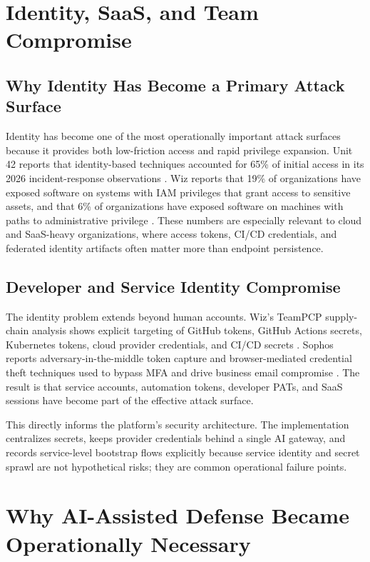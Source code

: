 \section{Identity, SaaS, and Team Compromise}
\subsection{Why Identity Has Become a Primary Attack Surface}
Identity has become one of the most operationally important attack surfaces because it provides both low-friction access and rapid privilege expansion. Unit 42 reports that identity-based techniques accounted for 65\% of initial access in its 2026 incident-response observations \cite{unit42_ir_2026}. Wiz reports that 19\% of organizations have exposed software on systems with IAM privileges that grant access to sensitive assets, and that 6\% of organizations have exposed software on machines with paths to administrative privilege \cite{wiz_ai_readiness_2026}. These numbers are especially relevant to cloud and SaaS-heavy organizations, where access tokens, CI/CD credentials, and federated identity artifacts often matter more than endpoint persistence.

\subsection{Developer and Service Identity Compromise}
The identity problem extends beyond human accounts. Wiz's TeamPCP supply-chain analysis shows explicit targeting of GitHub tokens, GitHub Actions secrets, Kubernetes tokens, cloud provider credentials, and CI/CD secrets \cite{wiz_supply_chain_2026}. Sophos reports adversary-in-the-middle token capture and browser-mediated credential theft techniques used to bypass MFA and drive business email compromise \cite{sophos_threat_2025}. The result is that service accounts, automation tokens, developer PATs, and SaaS sessions have become part of the effective attack surface.

This directly informs the platform's security architecture. The implementation centralizes secrets, keeps provider credentials behind a single AI gateway, and records service-level bootstrap flows explicitly because service identity and secret sprawl are not hypothetical risks; they are common operational failure points.

\section{Why AI-Assisted Defense Became Operationally Necessary}
